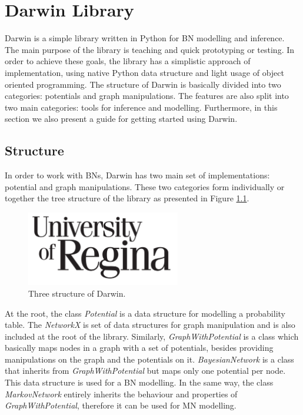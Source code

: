 \chapter{Darwin Library}
\label{sec:darwin_lib}

Darwin is a simple library written in Python for BN modelling and inference.
The main purpose of the library is teaching and quick prototyping or testing.
In order to achieve these goals, the library has a simplistic approach of implementation, using native Python data structure and light usage of object oriented programming.
The structure of Darwin is basically divided into two categories: potentials and graph manipulations.
The features are also split into two main categories: tools for inference and modelling.
Furthermore, in this section we also present a guide for getting started using Darwin.

\section{Structure}
\label{sec:system:sec1}

In order to work with BNs, Darwin has two main set of implementations: potential and graph manipulations.
These two categories form individually or together the tree structure of the library as presented in Figure \ref{fig:tree_darwin}.

\begin{figure}[hbt]
    \begin{center}
        \includegraphics[width=0.6\textwidth]{img/logo_uofr_black}
    \end{center}
    \caption{Three structure of Darwin.}
    \label{fig:tree_darwin}
\end{figure}


At the root, the class \emph{Potential} is a data structure for modelling a probability table.
The \emph{NetworkX} is set of data structures for graph manipulation and is also included at the root of the library.
Similarly, \emph{GraphWithPotential} is a class which basically maps nodes in a graph with a set of potentials, besides providing manipulations on the graph and the potentials on it.
\emph{BayesianNetwork} is a class that inherits from \emph{GraphWithPotential} but maps only one potential per node.
This data structure is used for a BN modelling.
In the same way, the class \emph{MarkovNetwork} entirely inherits the behaviour and properties of \emph{GraphWithPotential}, therefore it can be used for MN modelling.

